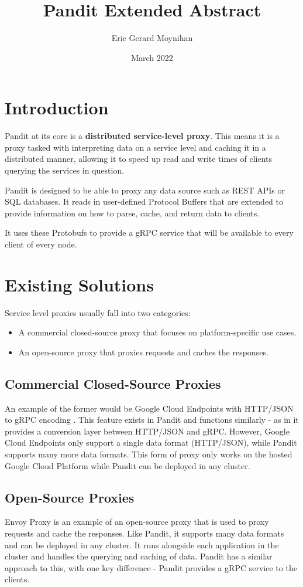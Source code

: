 \documentclass[a4paper,12pt]{report}
\title{Pandit Extended Abstract}
\author{Eric Gerard Moynihan}
\date{March 2022}
\begin{document}
\maketitle

\section{Introduction}
Pandit at its core is a \textbf{distributed service-level proxy}.
This means it is a proxy tasked with interpreting data on a service level and caching it
in a distributed manner, allowing it to speed up read and write times of clients querying the services
in question.


Pandit is designed to be able to proxy any data source such as REST APIs or SQL databases.
It reads in user-defined Protocol Buffers \cite{protobufs} that are extended to provide information on
how to parse, cache, and return data to clients.

It uses these Protobufs to provide a gRPC \cite{grpc} service that will be available to every client of every node.


\section{Existing Solutions}
Service level proxies usually fall into two categories:
\begin{itemize}
    \item A commercial closed-source proxy that focuses on platform-specific use cases.
    \item An open-source proxy that proxies requests and caches the responses.
\end{itemize}
\subsection{Commercial Closed-Source Proxies}
An example of the former would be Google Cloud Endpoints with HTTP/JSON to gRPC encoding \cite{cloud_endpoints}.
This feature exists in Pandit and functions similarly - as in it provides a conversion layer between
HTTP/JSON and gRPC. However, Google Cloud Endpoints only support a single data format (HTTP/JSON), while Pandit supports
many more data formats.
This form of proxy only works on the hosted Google Cloud Platform \cite{google_cloud_platform} while Pandit can be deployed
in any cluster.

\subsection{Open-Source Proxies}
Envoy Proxy \cite{envoy} is an example of an open-source proxy that is used to proxy requests and cache the responses.
Like Pandit, it supports many data formats and can be deployed in any cluster.
It runs alongside each application in the cluster and handles the querying and caching of data.
Pandit has a similar approach to this, with one key difference - Pandit provides a gRPC service to the clients.
\end{document}
